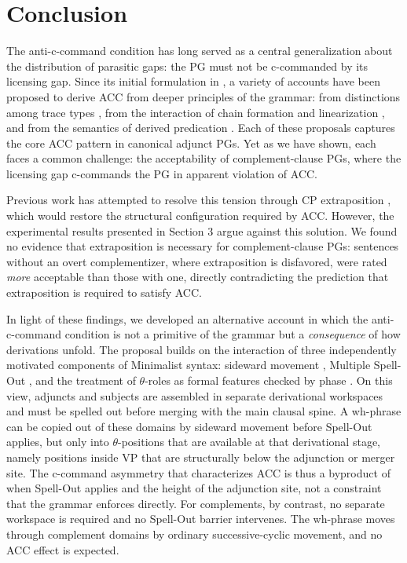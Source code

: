 \documentclass[12pt]{article}
\begin{document}
\section{Conclusion}

The anti-c-command condition has long served as a central generalization about the distribution of parasitic gaps: the PG must not be c-commanded by its licensing gap. Since its initial formulation in \cite{engdahl1983}, a variety of accounts have been proposed to derive ACC from deeper principles of the grammar: from distinctions among trace types \citep{chomsky1981, chomsky1982}, from the interaction of chain formation and linearization \citep{nunes2004}, and from the semantics of derived predication \citep{nissenbaum2000, arregi2022}. Each of these proposals captures the core ACC pattern in canonical adjunct PGs. Yet as we have shown, each faces a common challenge: the acceptability of complement-clause PGs, where the licensing gap c-commands the PG in apparent violation of ACC.

Previous work has attempted to resolve this tension through CP extraposition \citep{arregi2022}, which would restore the structural configuration required by ACC. However, the experimental results presented in Section 3 argue against this solution. We found no evidence that extraposition is necessary for complement-clause PGs: sentences without an overt complementizer, where extraposition is disfavored, were rated \textit{more} acceptable than those with one, directly contradicting the prediction that extraposition is required to satisfy ACC.

In light of these findings, we developed an alternative account in which the anti-c-command condition is not a primitive of the grammar but a \textit{consequence} of how derivations unfold. The proposal builds on the interaction of three independently motivated components of Minimalist syntax: sideward movement \citep{nunes2004}, Multiple Spell-Out \citep{uriagereka1999}, and the treatment of $\theta$-roles as formal features checked by phase \citep{hornstein1999}. On this view, adjuncts and subjects are assembled in separate derivational workspaces and must be spelled out before merging with the main clausal spine. A wh-phrase can be copied out of these domains by sideward movement before Spell-Out applies, but only into $\theta$-positions that are available at that derivational stage, namely positions inside VP that are structurally below the adjunction or merger site. The c-command asymmetry that characterizes ACC is thus a byproduct of when Spell-Out applies and the height of the adjunction site, not a constraint that the grammar enforces directly. For complements, by contrast, no separate workspace is required and no Spell-Out barrier intervenes. The wh-phrase moves through complement domains by ordinary successive-cyclic movement, and no ACC effect is expected.
\end{document}

